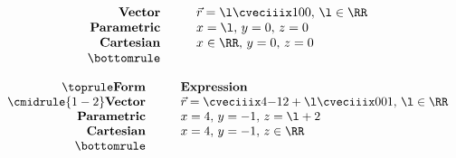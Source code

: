 \begin{solution}
\begin{ppart}
\[\begin{array}{r @{\hspace*{1.0cm}} l}
            \textbf{Vector} & \vec r = \l \cveciiix100, \, \l \in \RR \\
            \textbf{Parametric} & x = \l, \, y = 0, \, z = 0\\
            \textbf{Cartesian} & x \in \RR, \, y = 0, \, z = 0 \\\bottomrule
        \end{array}\]
    \end{ppart}
    \begin{ppart}
        \[\begin{array}{r @{\hspace*{1.0cm}} l}\toprule
            \textbf{Form} & \textbf{Expression} \\\cmidrule{1-2}
            \textbf{Vector} & \vec r = \cveciiix4{-1}2 + \l \cveciiix001, \, \l \in \RR \\
            \textbf{Parametric} & x = 4, \, y = -1, \, z = \l + 2 \\
            \textbf{Cartesian} & x = 4, \, y = -1, \, z \in \RR \\\bottomrule
        \end{array}\]
    \end{ppart}
\end{solution}

